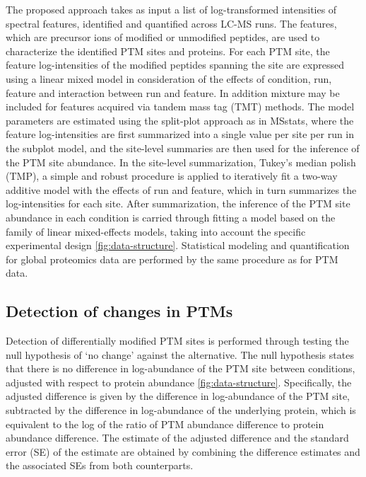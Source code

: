 \documentclass[mcp]{article}
\numberwithin{figure}{section} %
\numberwithin{table}{section}
\begin{document}
The proposed approach takes as input a list of log-transformed intensities of spectral features, identified and quantified across LC-MS runs. The features, which are precursor ions of modified or unmodified peptides, are used to characterize the identified PTM sites and proteins. For each PTM site, the feature log-intensities of the modified peptides spanning the site are expressed using a linear mixed model in consideration of the effects of condition, run, feature and interaction between run and feature. In addition mixture may be included for features acquired via tandem mass tag (TMT) methods. The model parameters are estimated using the split-plot approach as in MSstats, where the feature log-intensities are first summarized into a single value per site per run in the subplot model, and the site-level summaries are then used for the inference of the PTM site abundance.\cite{Choi:2014} In the site-level summarization, Tukey's median polish (TMP), a simple and robust procedure is applied to iteratively fit a two-way additive model with the effects of run and feature, which in turn summarizes the log-intensities for each site.\cite{Tukey:1977} After summarization, the inference of the PTM site abundance in each condition is carried through fitting a model based on the family of linear mixed-effects models, taking into account the specific experimental design \ref{fig:data-structure}.\cite{Bolker2009} \cite{Faraway:2006} Statistical modeling and quantification for global proteomics data are performed by the same procedure as for PTM data.

\subsection*{Detection of changes in PTMs}

Detection of differentially modified PTM sites is performed through testing the null hypothesis of ‘no change’ against the alternative. The null hypothesis states that there is no difference in log-abundance of the PTM site between conditions, adjusted with respect to protein abundance \ref{fig:data-structure}. Specifically, the adjusted difference is given by the difference in log-abundance of the PTM site, subtracted by the difference in log-abundance of the underlying protein, which is equivalent to the log of the ratio of PTM abundance difference to protein abundance difference. The estimate of the adjusted difference and the standard error (SE) of the estimate are obtained by combining the difference estimates and the associated SEs from both counterparts.
\end{document}
